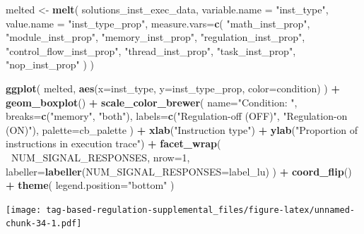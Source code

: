 \documentclass[]{book}
\newenvironment{Shaded}{\begin{snugshade}}{\end{snugshade}}
\newcommand{\DataTypeTok}[1]{\textcolor[rgb]{0.13,0.29,0.53}{#1}}
\newcommand{\DecValTok}[1]{\textcolor[rgb]{0.00,0.00,0.81}{#1}}
\newcommand{\KeywordTok}[1]{\textcolor[rgb]{0.13,0.29,0.53}{\textbf{#1}}}
\newcommand{\NormalTok}[1]{#1}
\newcommand{\OperatorTok}[1]{\textcolor[rgb]{0.81,0.36,0.00}{\textbf{#1}}}
\newcommand{\StringTok}[1]{\textcolor[rgb]{0.31,0.60,0.02}{#1}}
\begin{document}
\begin{Shaded}
\begin{Highlighting}[]
\NormalTok{melted <-}\StringTok{ }\KeywordTok{melt}\NormalTok{(}
\NormalTok{  solutions_inst_exec_data,}
  \DataTypeTok{variable.name =} \StringTok{"inst_type"}\NormalTok{,}
  \DataTypeTok{value.name =} \StringTok{"inst_type_prop"}\NormalTok{,}
  \DataTypeTok{measure.vars=}\KeywordTok{c}\NormalTok{(}
    \StringTok{"math_inst_prop"}\NormalTok{,}
    \StringTok{"module_inst_prop"}\NormalTok{,}
    \StringTok{"memory_inst_prop"}\NormalTok{,}
    \StringTok{"regulation_inst_prop"}\NormalTok{,}
    \StringTok{"control_flow_inst_prop"}\NormalTok{,}
    \StringTok{"thread_inst_prop"}\NormalTok{,}
    \StringTok{"task_inst_prop"}\NormalTok{,}
    \StringTok{"nop_inst_prop"}
\NormalTok{  )}
\NormalTok{)}

\KeywordTok{ggplot}\NormalTok{( melted, }\KeywordTok{aes}\NormalTok{(}\DataTypeTok{x=}\NormalTok{inst_type, }\DataTypeTok{y=}\NormalTok{inst_type_prop, }\DataTypeTok{color=}\NormalTok{condition) ) }\OperatorTok{+}
\StringTok{  }\KeywordTok{geom_boxplot}\NormalTok{() }\OperatorTok{+}
\StringTok{  }\KeywordTok{scale_color_brewer}\NormalTok{(}
    \DataTypeTok{name=}\StringTok{"Condition: "}\NormalTok{,}
    \DataTypeTok{breaks=}\KeywordTok{c}\NormalTok{(}\StringTok{"memory"}\NormalTok{, }\StringTok{"both"}\NormalTok{),}
    \DataTypeTok{labels=}\KeywordTok{c}\NormalTok{(}\StringTok{"Regulation-off (OFF)"}\NormalTok{, }\StringTok{"Regulation-on (ON)"}\NormalTok{),}
    \DataTypeTok{palette=}\NormalTok{cb_palette}
\NormalTok{  ) }\OperatorTok{+}
\StringTok{  }\KeywordTok{xlab}\NormalTok{(}\StringTok{"Instruction type"}\NormalTok{) }\OperatorTok{+}
\StringTok{  }\KeywordTok{ylab}\NormalTok{(}\StringTok{"Proportion of instructions in execution trace"}\NormalTok{) }\OperatorTok{+}
\StringTok{  }\KeywordTok{facet_wrap}\NormalTok{(}
    \OperatorTok{~}\NormalTok{NUM_SIGNAL_RESPONSES,}
    \DataTypeTok{nrow=}\DecValTok{1}\NormalTok{,}
    \DataTypeTok{labeller=}\KeywordTok{labeller}\NormalTok{(}\DataTypeTok{NUM_SIGNAL_RESPONSES=}\NormalTok{label_lu)}
\NormalTok{  ) }\OperatorTok{+}
\StringTok{  }\KeywordTok{coord_flip}\NormalTok{() }\OperatorTok{+}
\StringTok{  }\KeywordTok{theme}\NormalTok{(}
    \DataTypeTok{legend.position=}\StringTok{"bottom"}
\NormalTok{  )}
\end{Highlighting}
\end{Shaded}

\texttt{[image: tag-based-regulation-supplemental\_files/figure-latex/unnamed-chunk-34-1.pdf]}
\end{document}
